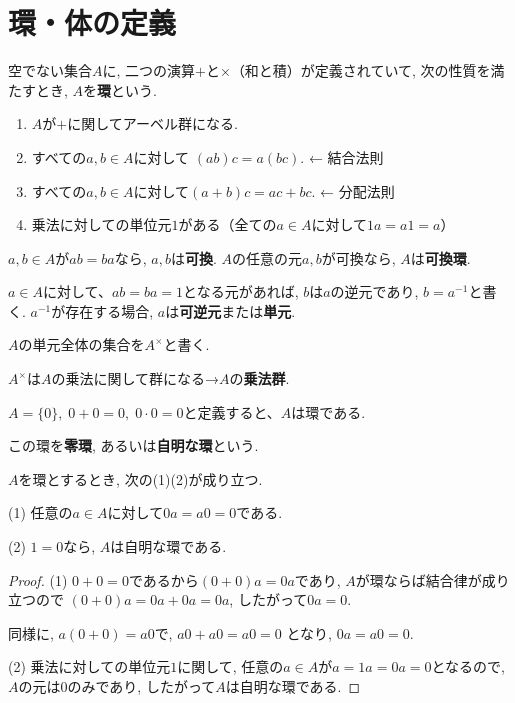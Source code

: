 \section*{環・体の定義}

\begin{dfn*}
	空でない集合$A$に, 二つの演算$+$と$\times$（和と積）が定義されていて,
	次の性質を満たすとき, $A$を\textbf{環}という.
	\begin{enumerate}[label=(\arabic*)\;]
		\item $A$が$+$に関してアーベル群になる.
		\item すべての$a,b \in A$に対して
		$ (ab)c=a(bc) $. ← 結合法則
		\item すべての$a,b \in A$に対して$ (a+b)c=ac+bc $. ← 分配法則
		\item 乗法に対しての単位元$1$がある（全ての$a\in A$に対して$1a=a1=a$）
	\end{enumerate}
\end{dfn*}\leavevmode

$a,b \in A$が$ab=ba$なら, $a,b$は\textbf{可換}.
$A$の任意の元$a,b$が可換なら, $A$は\textbf{可換環}.

$a\in A$に対して、$ab=ba=1$となる元があれば, 
$b$は$a$の逆元であり, $b=a^{-1}$と書く.
$a^{-1}$が存在する場合, $a$は\textbf{可逆元}または\textbf{単元}.
\newline

$ A$の単元全体の集合を$A^\times$と書く.

$ A^\times$は$A$の乗法に関して群になる→$A$の\textbf{乗法群}.

$ A=\{0\},\; 0+0=0,\; 0\cdot 0=0 $と定義すると、$A$は環である.

この環を\textbf{零環}, あるいは\textbf{自明な環}という.
\newline

\begin{tcolorbox}
\begin{prp*}
  $A$を環とするとき, 次の(1)(2)が成り立つ.

  (1) 任意の$a \in A$に対して$0a=a0=0$である.

  (2) $1=0$なら, $A$は自明な環である.
\end{prp*}
\end{tcolorbox}

\begin{proof}
  (1) $0+0=0$であるから$(0+0)a=0a$であり,
  $A$が環ならば結合律が成り立つので $(0+0)a=0a+0a=0a$, 
  したがって$0a=0$.
  
  同様に, $a(0+0)=a0$で, $a0+a0=a0=0$
  となり, $0a=a0=0$.
  
  (2) 乗法に対しての単位元$1$に関して, 任意の$a \in A$が$a=1a=0a=0$となるので, 
  $A$の元は$0$のみであり, したがって$A$は自明な環である.
\end{proof}\leavevmode


